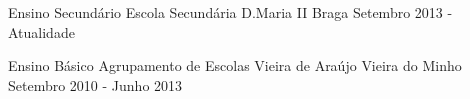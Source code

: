 

\begin{cventries}

  \cventry
    {Ensino Secundário} %
    {Escola Secundária D.Maria II} %
    {Braga} %
    {Setembro 2013 - Atualidade} %
    {
    }
    
  \cventry
    {Ensino Básico} %
    {Agrupamento de Escolas Vieira de Araújo} %
    {Vieira do Minho} %
    {Setembro 2010 - Junho 2013} %
    {
    }

\end{cventries}
